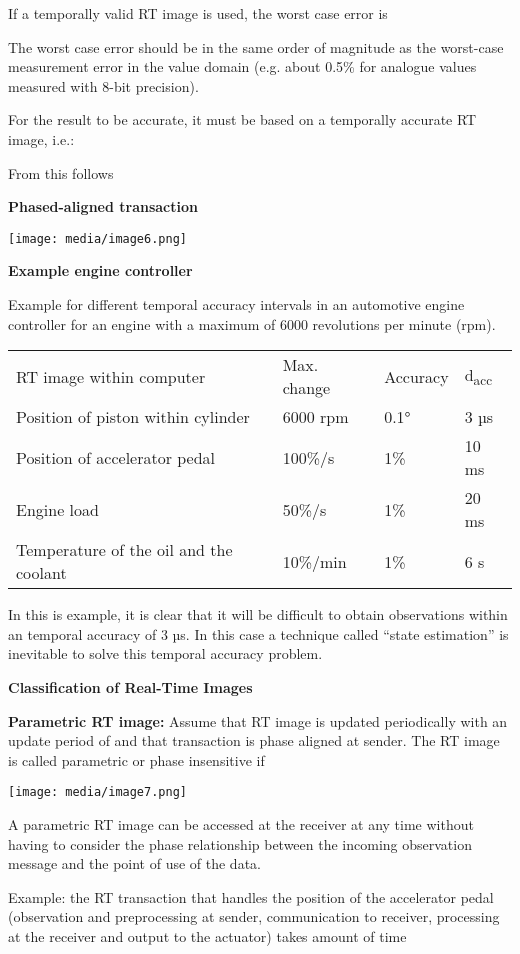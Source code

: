 If a temporally valid RT image is used, the worst case error is

The worst case error should be in the same order of magnitude as the
worst-case measurement error in the value domain (e.g. about 0.5\% for
analogue values measured with 8-bit precision).

For the result to be accurate, it must be based on a temporally accurate
RT image, i.e.:

From this follows

\textbf{Phased-aligned transaction}

\texttt{[image: media/image6.png]}

\textbf{Example engine controller}

Example for different temporal accuracy intervals in an automotive
engine controller for an engine with a maximum of 6000 revolutions per
minute (rpm).

\begin{longtable}[c]{@{}llll@{}}
\toprule
RT image within computer & Max. change & Accuracy &
d\textsubscript{acc}\tabularnewline
Position of piston within cylinder & 6000 rpm & 0.1° & 3
µs\tabularnewline
Position of accelerator pedal & 100\%/s & 1\% & 10 ms\tabularnewline
Engine load & 50\%/s & 1\% & 20 ms\tabularnewline
Temperature of the oil and the coolant & 10\%/min & 1\% & 6
s\tabularnewline
\bottomrule
\end{longtable}

In this is example, it is clear that it will be difficult to obtain
observations within an temporal accuracy of 3 µs. In this case a
technique called ``state estimation'' is inevitable to solve this
temporal accuracy problem.

\textbf{Classification of Real-Time Images}

\textbf{Parametric RT image:} Assume that RT image is updated
periodically with an update period of and that transaction is phase
aligned at sender. The RT image is called parametric or phase
insensitive if

\texttt{[image: media/image7.png]}

A parametric RT image can be accessed at the receiver at any time
without having to consider the phase relationship between the incoming
observation message and the point of use of the data.

Example: the RT transaction that handles the position of the accelerator
pedal (observation and preprocessing at sender, communication to
receiver, processing at the receiver and output to the actuator) takes
amount of time

